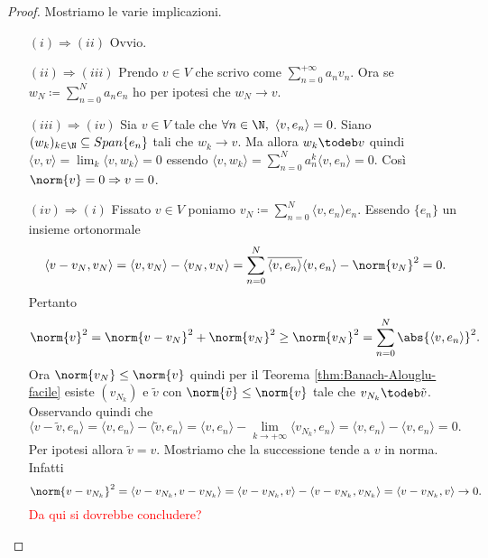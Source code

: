 \begin{proof}   
    Mostriamo le varie implicazioni. 
    \begin{enumerate}
        \item[$ (i) \Rightarrow (ii) $] Ovvio.
        \item[$ (ii) \Rightarrow (iii) $] Prendo $ v \in V $ che scrivo come $ \sum_{n = 0}^{+\infty} a_n v_n $. Ora se $ w_{N} \coloneqq \sum_{n = 0}^{N} a_ne_n $ ho per ipotesi che $ w_N \to v $. 
        \item[$ (iii) \Rightarrow (iv) $] Sia $ v \in V $ tale che $ \forall n \in \N, \ {\langle v, e_n \rangle} = 0 $. Siano $ (w_k)_{k \in \N} \subseteq Span{\{e_n\}} $ tali che $ w_k \to v $. Ma allora $ w_k \todeb v $ quindi $ {\langle v, v \rangle} = \lim_{k} {\langle v, w_k \rangle} = 0 $ essendo $ {\langle v, w_k \rangle} = \sum_{n = 0}^{N} a_n^k {\langle v, e_n \rangle} = 0 $. Così $ \norm{v} = 0 \Rightarrow v = 0 $. 
        \item[$ (iv) \Rightarrow (i) $] Fissato $ v \in V $ poniamo $ v_N \coloneqq \sum_{n = 0}^{N} {\langle v, e_n \rangle} e_n $. Essendo $ \{e_n\} $ un insieme ortonormale
        \[
            {\langle v - v_N, v_N \rangle} = {\langle v, v_N \rangle} - {\langle v_N, v_N \rangle} = \sum_{n = 0}^{N} \overline{{\langle v, e_n \rangle}}{\langle v, e_n \rangle} - \norm{v_N}^2 = 0.
        \]
        Pertanto
        \[
            \norm{v}^2 = \norm{v - v_N}^2 + \norm{v_N}^2 \geq \norm{v_N}^2 = \sum_{n = 0}^{N} \abs{{\langle v, e_n \rangle}}^2.
        \]
        Ora $ \norm{v_N} \leq \norm{v} $ quindi per il Teorema \ref{thm:Banach-Alouglu-facile} esiste $ (v_{N_k}) $ e $ \tilde{v} $ con $ \norm{\tilde{v}} \leq \norm{v} $ tale che $ v_{N_k} \todeb \tilde{v} $. Osservando quindi che 
        \[
            {\langle v - \tilde{v}, e_n \rangle} = {\langle v, e_n \rangle} - {\langle \tilde{v}, e_n \rangle} = {\langle v, e_n \rangle} - \lim_{k \to + \infty} {\langle v_{N_k}, e_n \rangle} = {\langle v, e_n \rangle} - {\langle v, e_n \rangle} = 0.
        \]
        Per ipotesi allora $ \tilde{v} = v $. Mostriamo che la successione tende a $ v $ in norma. Infatti
        \[
            \norm{v - v_{N_k}}^2 = {\langle v - v_{N_k}, v - v_{N_k}\rangle} = {\langle v - v_{N_k}, v \rangle} - {\langle v - v_{N_k}, v_{N_k} \rangle} = {\langle v - v_{N_k}, v \rangle} \to 0.
        \]
        \textcolor{red}{Da qui si dovrebbe concludere?} \qedhere
    \end{enumerate}
\end{proof}

